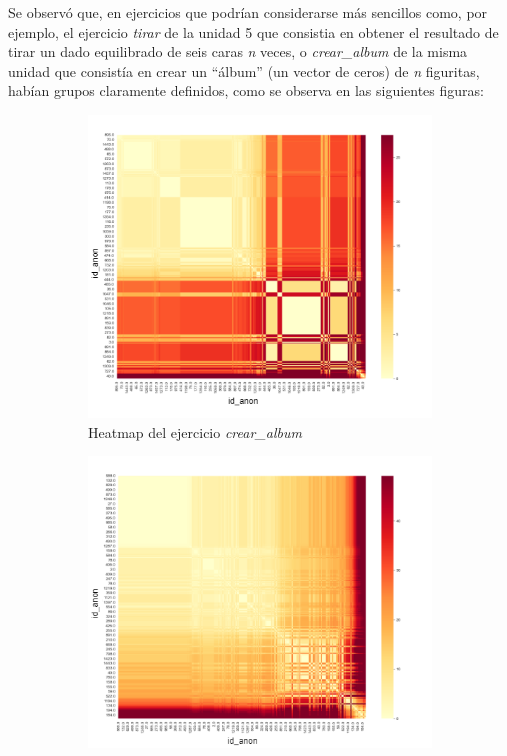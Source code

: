 \documentclass[11pt,a4paper,twoside,openany]{tesis}
\begin{document}
Se observó que, en ejercicios que podrían considerarse más sencillos como, por ejemplo, el ejercicio \emph{tirar} de la unidad 5 que consistia en obtener el resultado de tirar un dado equilibrado de seis caras \emph{n} veces, o \emph{crear\_album} de la misma unidad que consistía en crear un ``álbum'' (un vector de ceros) de \emph{n} figuritas, habían grupos claramente definidos, como se observa en las siguientes figuras:
\begin{figure}[H]
    \centering
    \begin{subfigure}{0.45\textwidth}
        \includegraphics[width=\linewidth]{imagenes/heatmap-1-crear album.png}
        \caption{Heatmap del ejercicio \emph{crear\_album}}
        \label{fig:figura1}
    \end{subfigure}
    \hfill
    \begin{subfigure}{0.45\textwidth}
        \includegraphics[width=\linewidth]{imagenes/heatmap-1-tirar.png}

\end{subfigure}
\end{figure}
\end{document}
